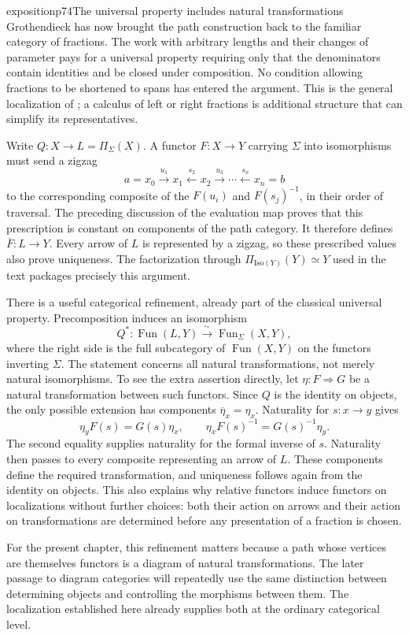 \begin{dcomment}{exposition}{p74}{The universal property includes natural transformations}
Grothendieck has now brought the path construction back to the familiar category of fractions. The work with arbitrary lengths and their changes of parameter pays for a universal property requiring only that the denominators contain identities and be closed under composition. No condition allowing fractions to be shortened to spans has entered the argument. This is the general localization of \citet[Chapter~I, \S1.1 and Lemma~1.2]{GabrielZisman1967}; a calculus of left or right fractions is additional structure that can simplify its representatives.

Write $Q:X\longrightarrow L=\Pi_\Sigma(X)$. A functor $F:X\longrightarrow Y$ carrying $\Sigma$ into isomorphisms must send a zigzag
\[
a=x_0\xrightarrow{u_1}x_1\xleftarrow{s_2}x_2
 \xrightarrow{u_3}\cdots\xleftarrow{s_n}x_n=b
\]
to the corresponding composite of the $F(u_i)$ and $F(s_j)^{-1}$, in their order of traversal. The preceding discussion of the evaluation map proves that this prescription is constant on components of the path category. It therefore defines $\overline F:L\longrightarrow Y$. Every arrow of $L$ is represented by a zigzag, so these prescribed values also prove uniqueness. The factorization through $\Pi_{\mathrm{Iso}(Y)}(Y)\simeq Y$ used in the text packages precisely this argument.

There is a useful categorical refinement, already part of the classical universal property. Precomposition induces an isomorphism
\[
 Q^*:\operatorname{Fun}(L,Y)\xrightarrow{\ \sim\ }
       \operatorname{Fun}_{\Sigma}(X,Y),
\]
where the right side is the full subcategory of $\operatorname{Fun}(X,Y)$ on the functors inverting $\Sigma$. The statement concerns all natural transformations, not merely natural isomorphisms. To see the extra assertion directly, let $\eta:F\Rightarrow G$ be a natural transformation between such functors. Since $Q$ is the identity on objects, the only possible extension has components $\overline\eta_x=\eta_x$. Naturality for $s:x\to y$ gives
\[
 \eta_yF(s)=G(s)\eta_x,
 \qquad
 \eta_xF(s)^{-1}=G(s)^{-1}\eta_y.
\]
The second equality supplies naturality for the formal inverse of $s$. Naturality then passes to every composite representing an arrow of $L$. These components define the required transformation, and uniqueness follows again from the identity on objects. This also explains why relative functors induce functors on localizations without further choices: both their action on arrows and their action on transformations are determined before any presentation of a fraction is chosen.

For the present chapter, this refinement matters because a path whose vertices are themselves functors is a diagram of natural transformations. The later passage to diagram categories will repeatedly use the same distinction between determining objects and controlling the morphisms between them. The localization established here already supplies both at the ordinary categorical level.
\end{dcomment}

